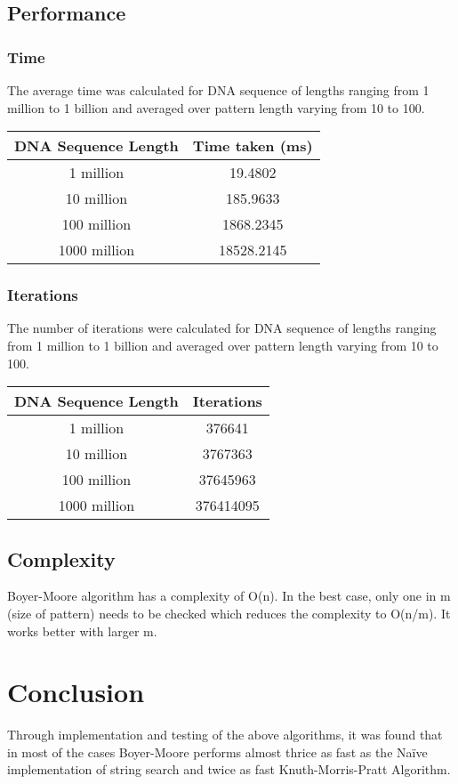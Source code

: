 \documentclass{article}
\begin{document}
\subsection{Performance}
\subsubsection{Time}
The average time was calculated for DNA sequence of lengths ranging from 1 million to 1 billion and averaged over pattern length varying from 10 to 100.
\noindent \begin{center}
\begin{tabular}{|c|c|}
\hline 
DNA Sequence Length & Time taken (ms)\tabularnewline
\hline 
\hline 
1 million & 19.4802\tabularnewline
\hline 
10 million & 185.9633\tabularnewline
\hline 
100 million & 1868.2345\tabularnewline
\hline 
1000 million & 18528.2145\tabularnewline
\hline 
\end{tabular}
\par\end{center}
\clearpage
\subsubsection{Iterations}
The number of iterations were calculated for DNA sequence of lengths ranging from 1 million to 1 billion and averaged over pattern length varying from 10 to 100.
\noindent \begin{center}
\begin{tabular}{|c|c|}
\hline 
DNA Sequence Length & Iterations\tabularnewline
\hline 
\hline 
1 million & 376641\tabularnewline
\hline 
10 million & 3767363\tabularnewline
\hline 
100 million & 37645963\tabularnewline
\hline 
1000 million & 376414095\tabularnewline
\hline 
\end{tabular}
\par\end{center}

\subsection{Complexity}
Boyer-Moore algorithm has a complexity of O(n). In the best case, only one in m (size of pattern) needs to be checked which reduces the complexity to O(n/m). It works better with larger m.

\section{Conclusion}
Through implementation and testing of the above algorithms, it was found that in most of the cases Boyer-Moore performs almost thrice as fast as the Na\"ive implementation of string search and twice as fast Knuth-Morris-Pratt Algorithm.
\end{document}
